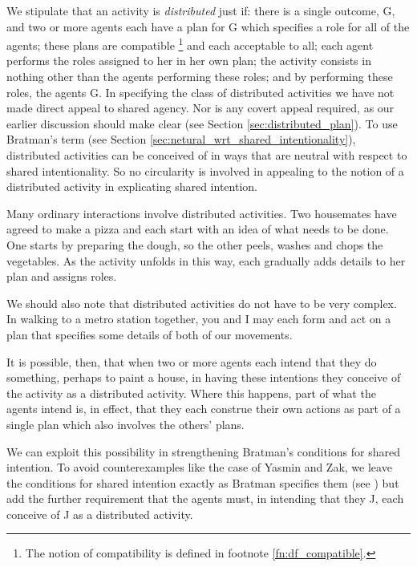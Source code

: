 \documentclass[12pt,\papersize]{extarticle}
\begin{document}
We stipulate that an activity is \emph{distributed} just if: 
	there is a single outcome, G,
	and two or more agents each have a plan for G which specifies a role for all of the agents;	
	these plans are compatible%
\footnote{
The notion of compatibility is defined in footnote \vref{fn:df_compatible}.
}
%
and each acceptable to all; 
	each agent performs the roles assigned to her in her own plan;
	the activity consists in nothing other than the agents performing these roles;
	and
	by performing these roles, the agents G.
In specifying the class of distributed activities we have not made direct appeal to shared agency. 
Nor is any covert appeal required, as our earlier discussion should  make clear (see Section \vref{sec:distributed_plan}).
To use Bratman's term (see Section \vref{sec:netural_wrt_shared_intentionality}), distributed activities can be conceived of in ways that are neutral with respect to shared intentionality.
So no circularity is involved in appealing to the notion of a distributed activity in explicating shared intention.

Many ordinary interactions involve distributed activities.
Two housemates have agreed to make a pizza and each start with an idea of what needs to be done.
One starts by preparing the dough, so the other peels, washes and chops the vegetables.
As the activity unfolds in this way, each gradually adds details to her plan and assigns roles. 

We should also note that distributed activities do not have to be very complex.
In walking to a metro station together,
you and I may each form and act on a plan that specifies some details of both of our movements.

It is possible, then, that when two or more agents each intend that they do something, 
	perhaps to paint a house,
in having these intentions they conceive of the activity as a distributed activity.
Where this happens, part of what the agents intend is, in effect, that they each construe their own actions as part of a single plan which also involves the others' plans.

We can exploit this possibility in strengthening Bratman's conditions for shared intention.
To avoid counterexamples like the case of Yasmin and Zak,
we leave the conditions for shared intention exactly as Bratman specifies them (see )
but add the further requirement that the agents must, in intending that they J, each conceive of J as a distributed activity.
\end{document}
